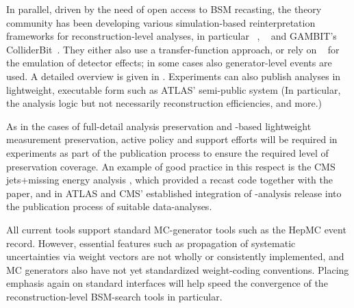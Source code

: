 \documentclass[11pt]{article}
\begin{document}
In parallel, driven by the need of open access to BSM recasting, the theory community has been developing various simulation-based reinterpretation frameworks for reconstruction-level analyses, in particular \checkmate~\cite{Drees:2013wra,Dercks:2016npn}, \madanalysis~\cite{Dumont:2014tja,Conte:2018vmg} and GAMBIT's ColliderBit~\cite{GAMBIT:2017qxg}. They either also use a transfer-function approach, or rely on \delphes~\cite{deFavereau:2013fsa} for the emulation of detector effects; in some cases also generator-level events are used. A detailed overview is given in \cite{LHCReinterpretationForum:2020xtr}.
%
Experiments can also publish analyses in lightweight, executable form such as ATLAS' semi-public \simpleanalysis system %
(In particular, the analysis logic but not necessarily reconstruction efficiencies, and more.)
%

As in the cases of full-detail analysis preservation and \rivet-based lightweight measurement preservation, active policy and support efforts will be required in experiments as part of the publication process to ensure the required level of preservation coverage. An example of good practice in this respect is the CMS jets+missing energy analysis \cite{CMS:2021far}, which provided a \madanalysis recast code \cite{Albert:2774586,DVN/IRF7ZL_2021} together with the paper, and in ATLAS and CMS' established integration of \rivet-analysis release into the publication process of suitable data-analyses.

All current tools support standard MC-generator tools such as the HepMC event record. However, essential features such as propagation of systematic uncertainties via weight vectors are not wholly or consistently implemented, and MC generators also have not yet standardized weight-coding conventions. Placing emphasis again on standard interfaces will help speed the convergence of the reconstruction-level BSM-search tools in particular.
\end{document}
